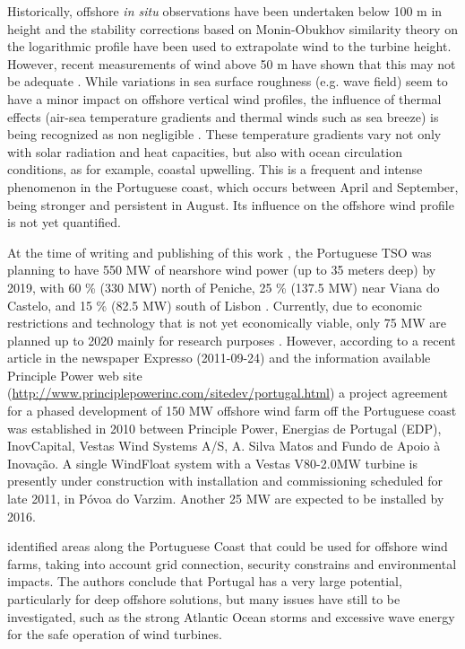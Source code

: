 Historically, offshore \textit{in situ} observations have been undertaken below 100 m in height and the stability corrections based on Monin-Obukhov similarity theory on the logarithmic profile have been used to extrapolate wind to the turbine height. However, recent measurements of wind above 50 m have shown that this may not be adequate \citep{Sempreviva2007}.  While variations in sea surface roughness (e.g. wave field) seem to have a minor impact on offshore vertical wind profiles, the influence of thermal effects (air-sea temperature gradients and thermal winds such as sea breeze) is being recognized as non negligible \citep{LangeB_PhD2002, Sempreviva2007}. These temperature gradients vary not only with solar radiation and heat capacities, but also with ocean circulation conditions, as for example, coastal upwelling. This is a frequent and intense phenomenon in the Portuguese coast, which occurs between April and September, being stronger and persistent in August. Its influence on the offshore wind profile is not yet quantified. 

At the time of writing and publishing of this work \citep{EOW2009}, the Portuguese TSO was planning to have 550 MW of nearshore wind power (up to 35 meters deep) by 2019, with 60 \% (330 MW) north of Peniche, 25 \% (137.5 MW) near Viana do Castelo, and 15 \% (82.5 MW) south of Lisbon \citep{REN2008}. Currently, due to economic restrictions and technology that is not yet economically viable, only 75 MW are planned up to 2020 mainly for research purposes \citep{NREAP2010}. However, according to a recent article in the newspaper Expresso (2011-09-24) and the information available Principle Power web site (\url {http://www.principlepowerinc.com/sitedev/portugal.html}) a project agreement for a phased development of 150 MW offshore wind farm off the Portuguese coast was established in 2010 between Principle Power, Energias de Portugal (EDP), InovCapital, Vestas Wind Systems A/S, A. Silva Matos and Fundo de Apoio à Inovação. A single WindFloat system with a Vestas V80-2.0MW turbine is presently under construction with installation and commissioning scheduled for late 2011, in Póvoa do Varzim. Another 25 MW are expected to be installed by 2016.

\cite{CostaEtAl2010} identified areas along the Portuguese Coast that could be used for offshore wind farms, taking into account grid connection, security constrains and environmental impacts. The authors conclude that Portugal has a very large potential, particularly for deep offshore solutions, but many issues have still to be investigated, such as the strong Atlantic Ocean storms and excessive wave energy for the safe operation of wind turbines.

